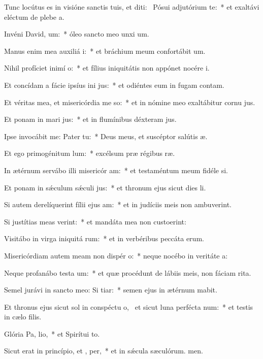\item Tunc locútus es in visióne sanctis tuis, et diti:~\pscross{} Pósui adjutórium  te:~* et exaltávi eléctum de plebe a.
\item Invéni David,  um:~* óleo sancto meo unxi um.
\item Manus enim mea auxiliá i:~* et bráchium meum confortábit um.
\item Nihil profíciet inimí  o:~* et fílius iniquitátis non appónet nocére i.
\item Et concídam a fácie ipsíus ini jus:~* et odiéntes eum in fugam contam.
\item Et véritas mea, et misericórdia me  so:~* et in nómine meo exaltábitur cornu jus.
\item Et ponam in mari  jus:~* et in flumínibus déxteram jus.
\item Ipse invocábit me: Pater   tu:~* Deus meus, et suscéptor salútis æ.
\item Et ego primogénitum  lum:~* excélsum præ régibus ræ.
\item In ætérnum servábo illi misericór am:~* et testaméntum meum fidéle si.
\item Et ponam in sǽculum sǽculi  jus:~* et thronum ejus sicut dies li.
\item Si autem derelíquerint fílii ejus  am:~* et in judíciis meis non ambuverint.
\item Si justítias meas verint:~* et mandáta mea non custoerint:
\item Visitábo in virga iniquitá rum:~* et in verbéribus peccáta erum.
\item Misericórdiam autem meam non dispér  o:~* neque nocébo in veritáte a:
\item Neque profanábo testa um:~* et quæ procédunt de lábiis meis, non fáciam rita.
\item Semel jurávi in sancto meo: Si  tiar:~* semen ejus in ætérnum mabit.
\item Et thronus ejus sicut sol in conspéctu o,~\pscross{} et sicut luna perfécta  num:~* et testis in cælo filis.
\item Glória Pa,  lio,~* et Spirítui to.
\item Sicut erat in princípio, et ,  per,~* et in sǽcula sæculórum. men.
